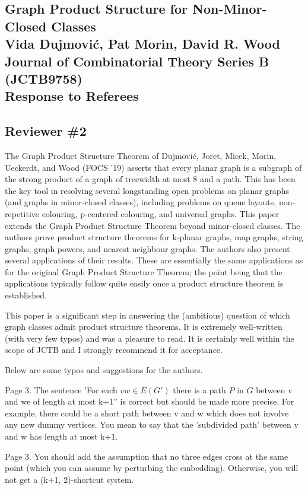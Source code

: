 \documentclass[12pt]{article}
\begin{document}
\subsection*{Graph Product Structure for Non-Minor-Closed Classes\\
Vida Dujmovi\'c, Pat Morin, David R. Wood\\
Journal of Combinatorial Theory Series B (JCTB9758)\\
Response to Referees}

\subsection*{Reviewer \#2}

 The Graph Product Structure Theorem of Dujmović, Joret,
Micek, Morin, Ueckerdt, and Wood (FOCS '19) asserts that every planar
graph is a subgraph of the strong product of a graph of treewidth at
most 8 and a path.  This has been the key tool in resolving several
longstanding open problems on planar graphs (and graphs in
minor-closed classes), including problems on queue layouts,
non-repetitive colouring, p-centered colouring, and universal graphs.
This paper extends the Graph Product Structure Theorem beyond
minor-closed classes.  The authors prove product structure theorems
for k-planar graphs, map graphs, string graphs, graph powers, and
nearest neighbour graphs.   The authors also present several
applications of their results.  These are essentially the same
applications as for the original Graph Product Structure Theorem; the
point being that the applications typically follow quite easily once a
product structure theorem is established.

This paper is a significant step in answering the (ambitious) question
of which graph classes admit product structure theorems. It is
extremely well-written (with very few typos) and was a pleasure to
read.  It is certainly well within the scope of JCTB and I strongly
recommend it for acceptance.

Below are some typos and suggestions for the authors.

Page 3.  The sentence 'For each $vw \in E(G')$ there is a path $P$ in $G$
between v and we of length at most k+1'' is correct but should be made
more precise.  For example, there could be a short path between v and
w which does not involve any new dummy vertices.  You mean to say that
the 'subdivided path' between v and w has length at most k+1.

Page 3.  You should add the assumption that no three edges cross at
the same point (which you can assume by perturbing the embedding).
Otherwise, you will not get a (k+1, 2)-shortcut system.
\end{document}
